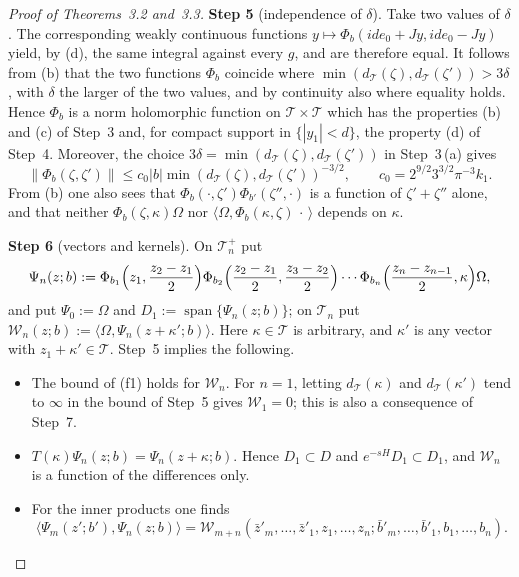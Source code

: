 \documentclass[11pt]{amsart}
\theoremstyle{definition}
\begin{document}
\begin{proof}[Proof of Theorems~3.2 and~3.3]
\textbf{Step 5} (independence of $\delta$).
Take two values of $\delta$.
The corresponding weakly continuous functions $y\mapsto\Phi_b(ide_0+Jy,ide_0-Jy)$ yield, by (d), the same integral against every $g$, and are therefore equal.
It follows from (b) that the two functions $\Phi_b$ coincide where $\min(d_{\mathcal T}(\zeta),d_{\mathcal T}(\zeta'))>3\delta$, with $\delta$ the larger of the two values, and by continuity also where equality holds.
Hence $\Phi_b$ is a norm holomorphic function on $\mathcal T\times\mathcal T$ which has the properties (b) and (c) of Step~3 and, for compact support in $\{|y_1|<d\}$, the property (d) of Step~4.
Moreover, the choice $3\delta=\min(d_{\mathcal T}(\zeta),d_{\mathcal T}(\zeta'))$ in Step~3\,(a) gives
\begin{equation*}
\|\Phi_b(\zeta,\zeta')\|\le c_0|b|\min(d_{\mathcal T}(\zeta),d_{\mathcal T}(\zeta'))^{-3/2},\qquad c_0=2^{9/2}3^{3/2}\pi^{-3}k_1.
\end{equation*}
From (b) one also sees that $\Phi_b(\cdot,\zeta')\Phi_{b'}(\zeta'',\cdot)$ is a function of $\zeta'+\zeta''$ alone, and that neither $\Phi_b(\zeta,\kappa)\Omega$ nor $\langle\Omega,\Phi_b(\kappa,\zeta)\,\cdot\,\rangle$ depends on $\kappa$.

\textbf{Step 6} (vectors and kernels).
On $\mathcal T_n^+$ put
\begin{equation*}
\Psi_n(z;b):=\Phi_{b_1}\Bigl(z_1,\frac{z_2-z_1}2\Bigr)\Phi_{b_2}\Bigl(\frac{z_2-z_1}2,\frac{z_3-z_2}2\Bigr)\cdots\Phi_{b_n}\Bigl(\frac{z_n-z_{n-1}}2,\kappa\Bigr)\Omega,
\end{equation*}
and put $\Psi_0:=\Omega$ and $D_1:=\operatorname{span}\{\Psi_n(z;b)\}$; on $\mathcal T_n$ put $\mathcal W_n(z;b):=\langle\Omega,\Psi_n(z+\kappa';b)\rangle$.
Here $\kappa\in\mathcal T$ is arbitrary, and $\kappa'$ is any vector with $z_1+\kappa'\in\mathcal T$.
Step~5 implies the following.
\begin{itemize}
\item[(a)] The bound of (f1) holds for $\mathcal W_n$.
For $n=1$, letting $d_{\mathcal T}(\kappa)$ and $d_{\mathcal T}(\kappa')$ tend to $\infty$ in the bound of Step~5 gives $\mathcal W_1=0$; this is also a consequence of Step~7.
\item[(b)] $T(\kappa)\Psi_n(z;b)=\Psi_n(z+\kappa;b)$.
Hence $D_1\subset D$ and $e^{-sH}D_1\subset D_1$, and $\mathcal W_n$ is a function of the differences only.
\item[(c)] For the inner products one finds
\begin{equation*}
\langle\Psi_m(z';b'),\Psi_n(z;b)\rangle=\mathcal W_{m+n}(\bar z'_m,\dots,\bar z'_1,z_1,\dots,z_n;\bar b'_m,\dots,\bar b'_1,b_1,\dots,b_n).
\end{equation*}
\end{itemize}


\end{proof}
\end{document}
